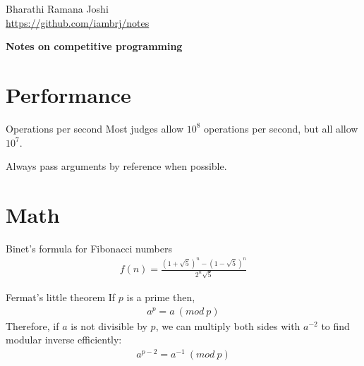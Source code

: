 \documentclass[titlepage, 12pt]{book}
\begin{document}
\begin{titlepage}

	\raggedleft

	\vspace*{\baselineskip}

	{Bharathi Ramana Joshi\\\url{https://github.com/iambrj/notes}}

	\vspace*{0.167\textheight}

	\textbf{\LARGE Notes on competitive programming}\\[\baselineskip]

	\vfill

	\vspace*{3\baselineskip}

\end{titlepage}

\newpage

\tableofcontents

\chapter{Performance}

\begin{definition}{Operations per second}{}
    Most judges allow $10^8$ operations per second, but all allow $10^7$.
\end{definition}

Always pass arguments by reference when possible.

\chapter{Math}

\begin{definition}{Binet's formula for Fibonacci numbers}{}
    \begin{align*}
        f(n) = \frac{(1 + \sqrt{5}) ^ n - (1 - \sqrt{5}) ^ n}{2^n\sqrt{5}}
    \end{align*}
\end{definition}

\begin{theorem}{Fermat's little theorem}{}
  If $p$ is a prime then,
  \begin{align*}
    a^p = a\ (mod\ p)
  \end{align*}
  Therefore, if $a$ is not divisible by $p$, we can multiply both sides with
  $a^{-2}$ to find modular inverse efficiently:
  \begin{align*}
    a^{p - 2} = a^{-1}\ (mod\ p)
  \end{align*}
\end{theorem}
\end{document}
